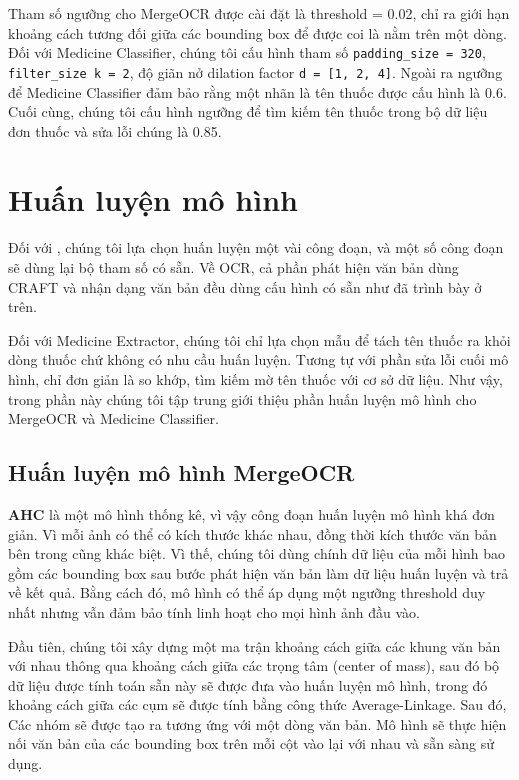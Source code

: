 Tham số ngưỡng cho MergeOCR được cài đặt là threshold = 0.02, chỉ ra giới hạn khoảng cách tương đối giữa các bounding box để được coi là nằm trên một dòng. Đối với Medicine Classifier, chúng tôi cấu hình tham số \verb|padding_size = 320|, \verb|filter_size k = 2|, độ giãn nở dilation factor \verb|d = [1, 2, 4]|. Ngoài ra ngưỡng để Medicine Classifier đảm bảo rằng một nhãn là tên thuốc được cấu hình là 0.6. Cuối cùng, chúng tôi cấu hình ngưỡng để tìm kiếm tên thuốc trong bộ dữ liệu đơn thuốc và sửa lỗi chúng là 0.85.

\section{Huấn luyện mô hình}

Đối với , chúng tôi lựa chọn huấn luyện một vài công đoạn, và một số công đoạn sẽ dùng lại bộ tham số có sẵn. Về OCR, cả phần phát hiện văn bản dùng CRAFT và nhận dạng văn bản đều dùng cấu hình có sẵn như đã trình bày ở trên. 

Đối với Medicine Extractor, chúng tôi chỉ lựa chọn mẫu để tách tên thuốc ra khỏi dòng thuốc chứ không có nhu cầu huấn luyện. Tương tự với phần sửa lỗi cuối mô hình, chỉ đơn giản là so khớp, tìm kiếm mờ tên thuốc với cơ sở dữ liệu.
Như vậy, trong phần này chúng tôi tập trung giới thiệu phần huấn luyện mô hình cho MergeOCR và Medicine Classifier.

\subsection{Huấn luyện mô hình MergeOCR}

\textbf{AHC} là một mô hình thống kê, vì vậy công đoạn huấn luyện mô hình khá đơn giản. Vì mỗi ảnh có thể có kích thước khác nhau, đồng thời kích thước văn bản bên trong cũng khác biệt. Vì thế, chúng tôi dùng chính dữ liệu của mỗi hình bao gồm các bounding box sau bước phát hiện văn bản làm dữ liệu huấn luyện và trả về kết quả. Bằng cách đó, mô hình có thể áp dụng một ngưỡng threshold duy nhất nhưng vẫn đảm bảo tính linh hoạt cho mọi hình ảnh đầu vào.

Đầu tiên, chúng tôi xây dựng một ma trận khoảng cách giữa các khung văn bản với nhau thông qua khoảng cách giữa các trọng tâm (center of mass), sau đó bộ dữ liệu được tính toán sẵn này sẽ được đưa vào huấn luyện mô hình, trong đó khoảng cách giữa các cụm sẽ được tính bằng công thức Average-Linkage. Sau đó, Các nhóm sẽ được tạo ra tương ứng với một dòng văn bản. Mô hình sẽ thực hiện nối văn bản của các bounding box trên mỗi cột vào lại với nhau và sẵn sàng sử dụng. 

